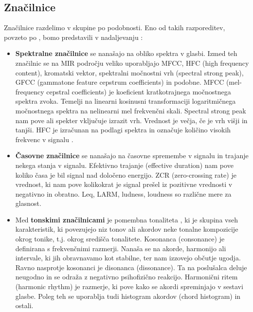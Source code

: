 \documentclass[a4paper, 12pt]{book}
\begin{document}
{\subsection{Značilnice}

Značilnice razdelimo v skupine po podobnosti. Eno od takih razporeditev, povzeto po \cite{laurier2007audio, bogdanov2013form}, bomo predstavili v nadaljevanju :

\begin{itemize}

  \item \textbf{Spektralne značilnice} se nanašajo na obliko spektra v glasbi. Izmed teh značilnic se na MIR področju veliko uporabljajo MFCC, HFC (high frequency content), kromatski vektor, spektralni močnostni vrh (spectral strong peak), GFCC (gammatone feature cepstrum coefficients) in podobne. 
MFCC (mel-frequency cepstral coefficients) \cite{gunderson2007musical} je koeficient kratkotrajnega močnostnega spektra zvoka. Temelji na linearni kosinusni transformaciji logaritmičnega močnostnega spektra na nelinearni mel frekvenčni skali. Spectral strong peak \cite{gouyon2001exploration} nam pove ali spekter vključuje izrazit vrh. Vrednost je večja, če je vrh višji in tanjši. HFC je izračunan na podlagi spektra in označuje količino visokih frekvenc v signalu \cite{brossier2004real}.

  \item \textbf{Časovne značilnice} se nanašajo na časovne spremembe v signalu in trajanje nekega stanja v signalu. Efektivno trajanje (effective duration) nam pove koliko časa je bil signal nad določeno energijo. ZCR (zero-crossing rate) \cite{gouyon2000classifying} je vrednost, ki nam pove kolikokrat je signal prešel iz pozitivne vrednosti v negativno in obratno. Leq, LARM, ludness, loudness so različne mere za glasnost. 
  
  \item Med \textbf{tonskimi značilnicami} je pomembna tonaliteta \cite{zhu2005music}, ki je skupina vseh karakteristik, ki povezujejo niz tonov ali akordov neke tonalne kompozicije okrog tonike, t.j. okrog središča tonalitete. Kosonanca  (consonance) \cite{terhardt1974pitch} je definirana s frekvenčnimi razmerji. Nanaša se na akorde, harmonijo ali intervale, ki jih obravnavamo kot stabilne, ter nam izzovejo občutje ugodja. Ravno nasprotje kosonanci je disonanca (dissonance). Ta na poslušalca deluje neugodno in se odraža z negativno psihofizično reakcijo. Harmonični ritem (harmonic rhythm) \cite{la2001harmonic} je razmerje, ki pove kako se akordi spreminjajo v sestavi glasbe. Poleg teh se uporablja tudi histogram akordov (chord histogram) in ostali.
  

\end{itemize}}
\end{document}
